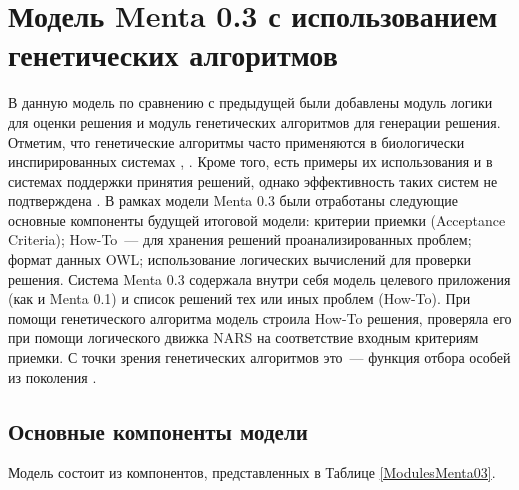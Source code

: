 \section{Модель Menta 0.3 с использованием генетических алгоритмов} \label{chapt2}
В данную модель по сравнению с предыдущей были добавлены модуль логики для оценки решения и модуль генетических алгоритмов для генерации решения. Отметим, что генетические алгоритмы часто применяются в биологически инспирированных системах \cite{G1}, \cite{G3}. Кроме того, есть примеры их использования и в системах поддержки принятия решений, однако эффективность таких систем не подтверждена \cite{G2}. В рамках модели Menta 0.3 были отработаны следующие основные компоненты будущей итоговой модели: критерии приемки (Acceptance Criteria); How-To~--- для хранения решений проанализированных проблем; формат данных OWL; использование логических вычислений для проверки решения. Система Menta 0.3 содержала внутри себя модель целевого приложения (как и Menta 0.1) и список решений тех или иных проблем (How-To). При помощи генетического алгоритма модель строила How-To решения, проверяла его при помощи логического движка NARS \cite{NARS} на соответствие входным критериям приемки. С точки зрения генетических алгоритмов это~--- функция отбора особей из поколения \cite{GFITNESS}. 

\subsection{Основные компоненты модели}
Модель состоит из компонентов, представленных в Таблице \ref{ModulesMenta03}.

